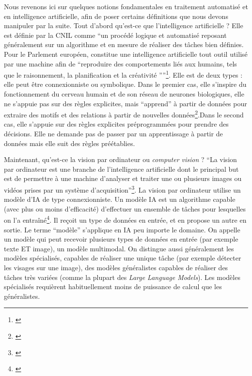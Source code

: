 \documentclass[12pt,twoside]{book}
\begin{document}
Nous revenons ici sur quelques notions fondamentales en traitement automatisé et en intelligence artificielle, afin de poser certains définitions que nous devons manipuler par la suite. Tout d'abord qu'est-ce que l'intelligence artificielle ? Elle est définie par la CNIL comme \enquote{un procédé logique et automatisé reposant généralement sur un algorithme et en mesure de réaliser des tâches bien définies. Pour le Parlement européen, constitue une intelligence artificielle tout outil utilisé par une machine afin de \textquotedblleft reproduire des comportements liés aux humains, tels que le raisonnement, la planification et la créativité \textquotedblright{}}\footnote{\cite{cnil_intelligence_nodate}}. Elle est de deux types : elle peut être connexionniste ou symbolique. Dans le premier cas, elle s'inspire du fonctionnement du cerveau humain et de son réseau de neurones biologiques, elle ne s'appuie pas sur des règles explicites, mais \enquote{apprend} à partir de données pour extraire des motifs et des relations à partir de nouvelles données\footnote{\cite{charpier_atelier_2025}}.Dans le second cas, elle s'appuie sur des règles explicites préprogrammées pour prendre des décisions. Elle ne demande pas de passer par un apprentissage à partir de données mais elle suit des règles préétablies. 

Maintenant, qu'est-ce la vision par ordinateur ou \textit{computer vision} ? \enquote{La vision par ordinateur est une branche de l’intelligence artificielle dont le principal but est de permettre à une machine d’analyser et traiter une ou plusieurs images ou vidéos prises par un système d’acquisition}\footnote{\cite{carius_lexique_2024}}. La vision par ordinateur utilise un modèle d'IA de type connexionniste. Un modèle IA est un algorithme capable (avec plus ou moins d’efficacité) d’effectuer un ensemble de tâches pour lesquelles on l’a entraîné\footnote{\cite{noauthor_quest-ce_2023}}. Il reçoit un type de données en entrée, et en propose un autre en sortie. Le terme “modèle” s’applique en IA peu importe le domaine. On appelle un modèle qui peut recevoir plusieurs types de données en entrée (par exemple texte ET image), un modèle multimodal. On distingue aussi généralement les modèles spécialisés, capables de réaliser une unique tâche (par exemple détecter les visages sur une image), des modèles généralistes capables de réaliser des tâches très variées (comme la plupart des \textit{Large Language Models}). Les modèles spécialisés requièrent habituellement moins de puissance de calcul que les généralistes.
\end{document}
